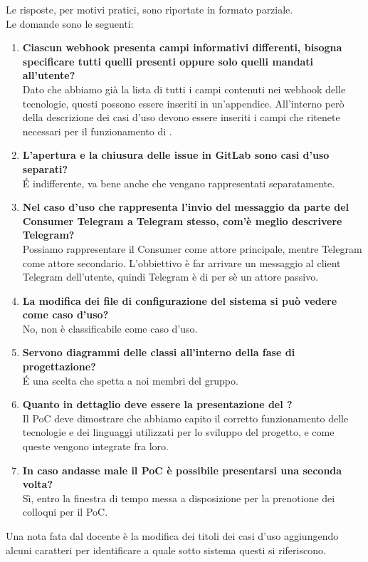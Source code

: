     	Le risposte, per motivi pratici, sono riportate in formato parziale.\\
        Le domande sono le seguenti:
    	
    	\begin{enumerate}
    		\item \textbf{Ciascun webhook presenta campi informativi differenti, bisogna specificare tutti quelli presenti oppure solo quelli mandati all'utente?}\\
            Dato che abbiamo già la lista di tutti i campi contenuti nei webhook delle tecnologie, questi possono essere inseriti in un'appendice. All'interno però della descrizione dei casi d'uso devono essere inseriti i campi che ritenete necessari per il funzionamento di \progetto.
    		\item \textbf{L'apertura e la chiusura delle issue in GitLab sono casi d'uso separati?}\\
            \'E indifferente, va bene anche che vengano rappresentati separatamente.
    		\item \textbf{Nel caso d'uso che rappresenta l'invio del messaggio da parte del Consumer Telegram a Telegram stesso, com'è meglio descrivere Telegram?}\\
            Possiamo rappresentare il Consumer come attore principale, mentre Telegram come attore secondario. L'obbiettivo è far arrivare un messaggio al client Telegram dell'utente, quindi Telegram è di per sè un attore passivo.
    		\item \textbf{La modifica dei file di configurazione del sistema si può vedere come caso d'uso?}\\
            No, non è classificabile come caso d'uso.
    		\item \textbf{Servono diagrammi delle classi all'interno della fase di progettazione?}\\
            \'E una scelta che spetta a noi membri del gruppo.
    		\item \textbf{Quanto in dettaglio deve essere la presentazione del ?}\\
            Il PoC deve dimostrare che abbiamo capito il corretto funzionamento delle tecnologie e dei linguaggi utilizzati per lo sviluppo del progetto, e come queste vengono integrate fra loro.
    		\item \textbf{In caso andasse male il PoC è possibile presentarsi una seconda volta?}\\
            Sì, entro la finestra di tempo messa a disposizione per la prenotione dei colloqui per il PoC.
    	\end{enumerate}
    	Una nota fata dal docente è la modifica dei titoli dei casi d'uso aggiungendo alcuni caratteri per identificare a quale sotto sistema questi si riferiscono.
